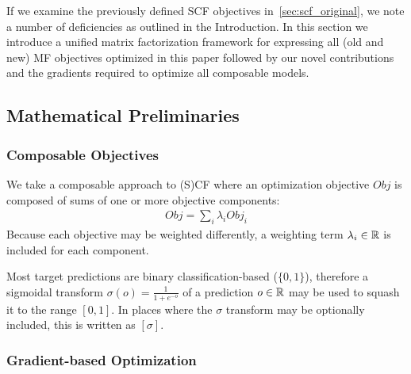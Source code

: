
If we examine the previously defined SCF objectives in~\ref{sec:scf_original},
we note a number of deficiencies as outlined in the Introduction.  In this
section we introduce a unified matrix factorization framework for
expressing all (old and new) MF objectives optimized in this paper
followed by our novel contributions and the gradients required to optimize
all composable models.

\subsection{Mathematical Preliminaries}

\subsubsection{Composable Objectives}


We take a composable approach to (S)CF 
where an optimization 
objective $\mathit{Obj}$ is composed of sums of one or more
objective components:
\begin{align}
\mathit{Obj} = \sum_i \lambda_i \mathit{Obj}_i
\end{align}
Because each objective may be weighted differently, a 
weighting term $\lambda_i \in \mathbb{R}$ is included for each 
component.

Most target predictions are binary 
classification-based ($\{0,1\}$), therefore
a sigmoidal transform 
$\sigma(o) = \frac{1}{1 + e^{-o}}$
of a prediction $o \in \mathbb{R}$ may be used to squash it 
to the range $[0, 1]$.  
In places where the $\sigma$ transform may be optionally included, 
this is written as $[\sigma]$.  

\subsubsection{Gradient-based Optimization}

